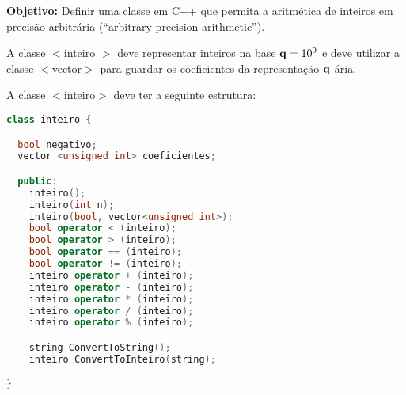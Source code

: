 
\usepackage{hyperref}
\newcommand{\shift}[1]{\setlength{\leftskip}{15 mm}{#1}\medskip}





\nextsect


{\bf Objetivo:} Definir uma classe em C++ que permita a aritmética de inteiros em precisão arbitrária (``arbitrary-precision arithmetic'').

 A classe $<$inteiro $>$ deve representar inteiros na base $\mathbf{q}=10^9$ e deve 
utilizar a classe $<$vector$>$ para guardar os coeficientes da representação $\mathbf{q}$-ária.

A classe $<$inteiro$>$ deve ter a seguinte estrutura:

\begin{lstlisting}[language=C++]
class inteiro {

  bool negativo; 
  vector <unsigned int> coeficientes;

  public:
    inteiro();
    inteiro(int n);
    inteiro(bool, vector<unsigned int>);
    bool operator < (inteiro);
    bool operator > (inteiro);
    bool operator == (inteiro);
    bool operator != (inteiro);
    inteiro operator + (inteiro);
    inteiro operator - (inteiro);
    inteiro operator * (inteiro);
    inteiro operator / (inteiro);
    inteiro operator % (inteiro);

    string ConvertToString();
    inteiro ConvertToInteiro(string);

}
\end{lstlisting}


